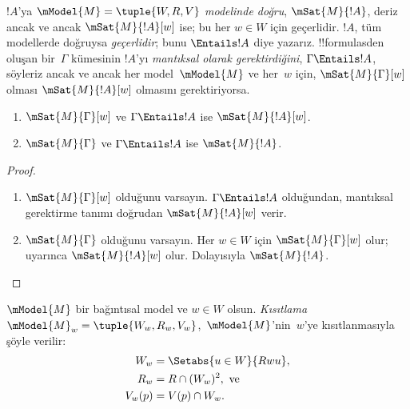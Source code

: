 \documentclass[../../../include/open-logic-section]{subfiles}
\begin{document}


\begin{defn}
  $!A$'ya \emph{$\mModel{M} = \tuple{W,R,V}$ modelinde doğru}, $
  \mSat{M}{!A}$, deriz ancak ve ancak $\mSat{M}{!A}[w]$ ise; bu her $w \in W$
  için geçerlidir. $!A$, tüm modellerde doğruysa \emph{geçerlidir}; bunu
  $\Entails !A$ diye yazarız. !!{formula}s{}den oluşan bir~$\Gamma$ kümesinin
  $!A$'yı \emph{mantıksal olarak gerektirdiğini}, $\Gamma \Entails !A$,
  söyleriz ancak ve ancak her model~$\mModel{M}$ ve her~$w$ için,
  $\mSat{M}{\Gamma}[w]$ olması $\mSat{M}{!A}[w]$ olmasını gerektiriyorsa.
\end{defn}

\begin{prop}
  \begin{enumerate}
  \item{} $\mSat{M}{\Gamma}[w]$ ve
    $\Gamma \Entails !A$ ise $\mSat{M}{!A}[w]$.
  \item{} $\mSat{M}{\Gamma}$ ve $\Gamma
    \Entails !A$ ise $\mSat{M}{!A}$.
  \end{enumerate}
\end{prop}

\begin{proof}
  \begin{enumerate}
  \item $\mSat{M}{\Gamma}[w]$ olduğunu varsayın. $\Gamma \Entails !A$
    olduğundan, mantıksal gerektirme tanımı doğrudan $\mSat{M}{!A}[w]$ verir.
  \item $\mSat{M}{\Gamma}$ olduğunu varsayın. Her $w \in W$ için
    $\mSat{M}{\Gamma}[w]$ olur;  uyarınca
    $\mSat{M}{!A}[w]$ olur. Dolayısıyla $\mSat{M}{!A}$.
  \end{enumerate}
\end{proof}


\begin{defn}
  $\mModel{M}$ bir bağıntısal model ve $w \in W$ olsun. \emph{Kısıtlama}
  $\mModel{M}_w=\tuple{W_w, R_w, V_w}$,~$\mModel{M}$'nin~$w$'ye kısıtlanmasıyla
  şöyle verilir:
  \begin{align*}
    W_w & = \Setabs{u \in W}{Rwu},\\
    R_w  & = R \cap (W_w)^2, \text{ ve}\\
    V_w(p) & = V(p) \cap W_w.
  \end{align*}
\end{defn}
\end{document}
